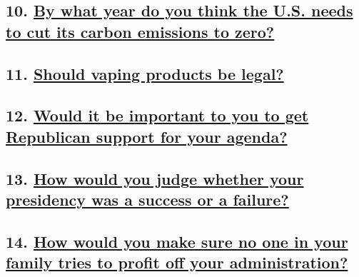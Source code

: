 \hypertarget{10-by-what-year-do-you-think-the-us-needs-to-cut-its-carbon-emissions-to-zero}{%
\subsection{\texorpdfstring{10.
\href{https://www.nytimes.com/interactive/2020/us/politics/carbon-emissions-20-questions.html}{By
what year do you think the U.S. needs to cut its carbon emissions to
zero?}}{10. By what year do you think the U.S. needs to cut its carbon emissions to zero?}}\label{10-by-what-year-do-you-think-the-us-needs-to-cut-its-carbon-emissions-to-zero}}

\hypertarget{11-should-vaping-products-be-legal}{%
\subsection{\texorpdfstring{11.
\href{https://www.nytimes.com/interactive/2020/us/politics/vaping-ban-20-questions.html}{Should
vaping products be
legal?}}{11. Should vaping products be legal?}}\label{11-should-vaping-products-be-legal}}

\hypertarget{12-would-it-be-important-to-you-to-get-republican-support-for-your-agenda}{%
\subsection{\texorpdfstring{12.
\href{https://www.nytimes.com/interactive/2020/us/politics/republicans-20-questions.html}{Would
it be important to you to get Republican support for your
agenda?}}{12. Would it be important to you to get Republican support for your agenda?}}\label{12-would-it-be-important-to-you-to-get-republican-support-for-your-agenda}}

\hypertarget{13-how-would-you-judge-whether-your-presidency-was-a-success-or-a-failure}{%
\subsection{\texorpdfstring{13.
\href{https://www.nytimes.com/interactive/2020/us/politics/success-failure-20-questions.html}{How
would you judge whether your presidency was a success or a
failure?}}{13. How would you judge whether your presidency was a success or a failure?}}\label{13-how-would-you-judge-whether-your-presidency-was-a-success-or-a-failure}}

\hypertarget{14-how-would-you-make-sure-no-one-in-your-family-tries-to-profit-off-your-administration}{%
\subsection{\texorpdfstring{14.
\href{https://www.nytimes.com/interactive/2020/us/politics/nepotism-corruption-20-questions.html}{How
would you make sure no one in your family tries to profit off your
administration?}}{14. How would you make sure no one in your family tries to profit off your administration?}}\label{14-how-would-you-make-sure-no-one-in-your-family-tries-to-profit-off-your-administration}}

